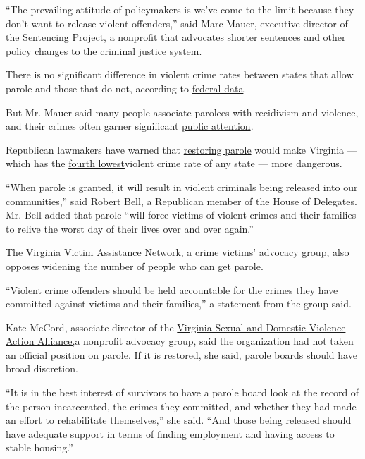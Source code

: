 ``The prevailing attitude of policymakers is we've come to the limit
because they don't want to release violent offenders,'' said Marc Mauer,
executive director of the
\href{https://www.sentencingproject.org/issues/racial-disparity/}{Sentencing
Project}, a nonprofit that advocates shorter sentences and other policy
changes to the criminal justice system.

There is no significant difference in violent crime rates between states
that allow parole and those that do not, according to
\href{https://www.prisonpolicy.org/reports/correctionalcontrol2018.html\#}{federal
data}.

But Mr. Mauer said many people associate parolees with recidivism and
violence, and their crimes often garner significant
\href{https://people.com/crime/man-out-on-parole-allegedly-strangled-honors-student-in-parking-garage-when-she-ignored-catcalls/}{public
attention}.

Republican lawmakers have warned that
\href{http://lis.virginia.gov/cgi-bin/legp604.exe?201+ful+SB91}{restoring
parole} would make Virginia --- which has the
\href{https://ucr.fbi.gov/crime-in-the-u.s/2018/crime-in-the-u.s.-2018/topic-pages/tables/table-4}{fourth
lowest}violent crime rate of any state --- more dangerous.

``When parole is granted, it will result in violent criminals being
released into our communities,'' said Robert Bell, a Republican member
of the House of Delegates. Mr. Bell added that parole ``will force
victims of violent crimes and their families to relive the worst day of
their lives over and over again.''

The Virginia Victim Assistance Network, a crime victims' advocacy group,
also opposes widening the number of people who can get parole.

``Violent crime offenders should be held accountable for the crimes they
have committed against victims and their families,'' a statement from
the group said.

Kate McCord, associate director of the
\href{http://www.vsdvalliance.org/}{Virginia Sexual and Domestic
Violence Action Alliance,}a nonprofit advocacy group, said the
organization had not taken an official position on parole. If it is
restored, she said, parole boards should have broad discretion.

``It is in the best interest of survivors to have a parole board look at
the record of the person incarcerated, the crimes they committed, and
whether they had made an effort to rehabilitate themselves,'' she said.
``And those being released should have adequate support in terms of
finding employment and having access to stable housing.''

